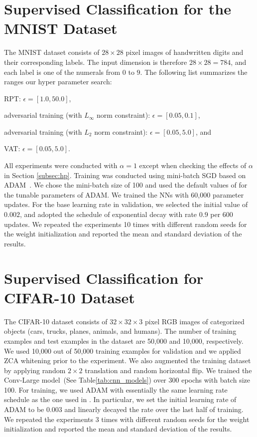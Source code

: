 \documentclass[10pt,journal,compsoc]{IEEEtran}
\newenvironment{tight_itemize}{
\begin{itemize}
  \setlength{\itemsep}{0pt}
  \setlength{\parskip}{0pt}
  \setlength{\topsep}{0pt}
  \setlength{\partopsep}{0pt}
}{\end{itemize}}
\begin{document}
\section{\label{apd:mnist_exp_set}Supervised Classification for the MNIST Dataset}
The MNIST dataset consists of $28 \times 28$ pixel images of handwritten digits and their corresponding labels. The input dimension is therefore $28 \times 28 = 784$, and each label is one of the numerals from $0$ to $9$.
The following list summarizes the ranges our hyper parameter search:
\begin{tight_itemize}
\item RPT: $\epsilon = [1.0, 50.0]$,
\item adversarial training (with $L_{\infty}$ norm constraint): $\epsilon=[0.05, 0.1]$,
\item adversarial training (with $L_{2}$ norm constraint): $\epsilon=[0.05,5.0]$, and
\item VAT: $\epsilon=[0.05,5.0].$
\end{tight_itemize}
All experiments were conducted with $\alpha = 1$ except when checking the effects of $\alpha$ in Section \ref{subsec:hp}.
Training was conducted using mini-batch SGD based on ADAM~\cite{kingma2014adam}.
We chose the mini-batch size of 100 and used the default values of \cite{kingma2014adam} for the tunable parameters
of ADAM. We trained the NNs with 60,000 parameter updates. For the base learning rate in validation, we selected the initial value of $0.002$, and adopted the schedule of exponential decay with rate $0.9$ per 600 updates. We repeated the experiments 10 times with different random seeds for the weight initialization and reported the mean and standard deviation of the results.

\section{\label{apd:semisup_details}Supervised Classification for CIFAR-10 Dataset}
The CIFAR-10 dataset consists of $32\times 32 \times 3$ pixel RGB images of categorized objects (cars, trucks, planes, animals, and humans). 
The number of training examples and test examples in the dataset are 50,000 and 10,000, respectively. 
We used 10,000 out of 50,000 training examples for validation and we applied ZCA whitening prior to the experiment. 
We also augmented the training dataset by applying random $2 \times 2$ translation and random horizontal flip.
We trained the Conv-Large model~(See Table\ref{tab:cnn_models}) over 300 epochs with batch size 100.
For training, we used ADAM with essentially the same learning rate schedule as the one used in \cite{salimans2016improved}. 
In particular, we set the initial learning rate of ADAM to be $0.003$ and linearly decayed the rate over the last half of training. 
We repeated the experiments 3 times with different random seeds for the weight initialization and reported the mean and standard deviation of the results.
\end{document}
